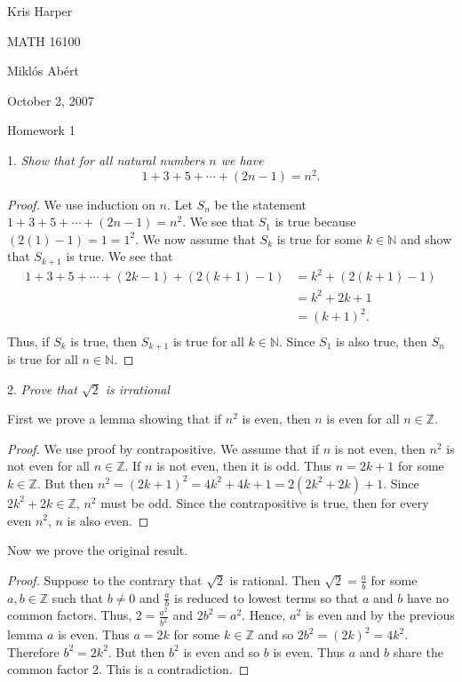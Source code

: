 \documentclass{article}
\begin{document}
\begin{flushright}
Kris Harper

MATH 16100

Mikl\'{o}s Ab\'{e}rt

October 2, 2007
\end{flushright}

\begin{center}
Homework 1
\end{center}

\begin{flushleft}

1. \textsl{Show that for all natural numbers $n$ we have
\[
1+3+5+ \cdots +(2n-1)=n^2.
\]}
\begin{proof}
We use induction on $n$. Let $S_n$ be the statement $1+3+5+ \cdots +(2n-1) = n^2$. We see that $S_1$ is true because $(2(1)-1)=1=1^2$. We now assume that $S_k$ is true for some $k \in \mathbb{N}$ and show that $S_{k+1}$ is true. We see that
\begin{align*}
1+3+5+ \cdots +(2k-1)+(2(k+1)-1) &= k^2 + (2(k+1) - 1) \\
								   &= k^2 + 2k + 1 \\
								   &= (k+1)^2. \\
\end{align*}
Thus, if $S_k$ is true, then $S_{k+1}$ is true for all $k \in \mathbb{N}$. Since $S_1$ is also true, then $S_n$ is true for all $n \in \mathbb{N}$.
\end{proof}

2. \textsl{Prove that $\sqrt{2}$ is irrational}\newline

First we prove a lemma showing that if $n^2$ is even, then $n$ is even for all $n \in \mathbb{Z}$.
\begin{proof}
We use proof by contrapositive. We assume that if $n$ is not even, then $n^2$ is not even for all $n \in \mathbb{Z}$. If $n$ is not even, then it is odd. Thus $n=2k+1$ for some $k \in \mathbb{Z}$. But then $n^2=(2k+1)^2=4k^2+4k+1=2(2k^2+2k)+1$. Since $2k^2+2k \in \mathbb{Z}$, $n^2$ must be odd. Since the contrapositive is true, then for every even $n^2$, $n$ is also even.
\end{proof}

Now we prove the original result.

\begin{proof}
Suppose to the contrary that $\sqrt{2}$ is rational. Then $\sqrt{2}=\frac{a}{b}$ for some $a,b \in \mathbb{Z}$ such that $b \neq 0$ and $\frac{a}{b}$ is reduced to lowest terms so that $a$ and $b$ have no common factors. Thus, $2=\frac{a^2}{b^2}$ and $2b^2=a^2$. Hence, $a^2$ is even and by the previous lemma $a$ is even. Thus $a=2k$ for some $k \in \mathbb{Z}$ and so $2b^2=(2k)^2=4k^2$. Therefore $b^2=2k^2$. But then $b^2$ is even and so $b$ is even. Thus $a$ and $b$ share the common factor $2$. This is a contradiction.
\end{proof}


\end{flushleft}
\end{document}
